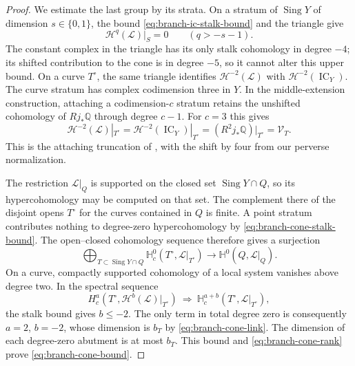 \documentclass[11pt]{amsart}
\theoremstyle{definition}
\theoremstyle{remark}
\numberwithin{equation}{section}
\newcommand{\Q}{\mathbb{Q}}
\DeclareMathOperator{\Sing}{Sing}
\DeclareMathOperator{\IC}{IC}
\begin{document}
\begin{proof}
We estimate the last group by its strata.  On a stratum of $\Sing Y$
of dimension $s\in\{0,1\}$, the bound
\eqref{eq:branch-ic-stalk-bound} and the triangle give
\begin{equation}\label{eq:branch-cone-stalk-bound}
 \mathcal H^q(\mathcal L)|_S=0\qquad(q>-s-1).
\end{equation}
The constant complex in the triangle has its only stalk cohomology
in degree $-4$; its shifted contribution to the cone is in degree
$-5$, so it cannot alter this upper bound.  On a curve $T^\circ$,
the same triangle identifies $\mathcal H^{-2}(\mathcal L)$ with
$\mathcal H^{-2}(\IC_Y)$.  The curve stratum has complex codimension
three in $Y$.  In the middle-extension construction, attaching a
codimension-$c$ stratum retains the unshifted cohomology of $Rj_*\Q$
through degree $c-1$.  For $c=3$ this gives
\begin{equation}\label{eq:branch-cone-link}
 \mathcal H^{-2}(\mathcal L)|_{T^\circ}
   =\mathcal H^{-2}(\IC_Y)|_{T^\circ}
   =(R^2j_*\Q)|_{T^\circ}=\mathcal V_T.
\end{equation}
This is the attaching truncation of
\cite[Section~3.1 and Section~3.3, Axiom {\rm[AX1]}(d)]{GoreskyMacPhersonIHII},
with the shift by four from our perverse normalization.

The restriction $\mathcal L|_Q$ is supported on the closed set
$\Sing Y\cap Q$, so its hypercohomology may be computed on that set.
The complement there of the disjoint opens $T^\circ$
for the curves contained in $Q$ is finite.  A point stratum contributes
nothing to degree-zero hypercohomology by
\eqref{eq:branch-cone-stalk-bound}.  The open--closed cohomology
sequence therefore gives a surjection
\[
 \bigoplus_{T\subset\Sing Y\cap Q}
       \mathbb H_c^0(T^\circ,\mathcal L|_{T^\circ})
       \longrightarrow\mathbb H^0(Q,\mathcal L|_Q).
\]
On a curve, compactly supported cohomology of a local system vanishes
above degree two.  In the spectral sequence
\[
 H_c^a(T^\circ,\mathcal H^b(\mathcal L)|_{T^\circ})
       \ \Longrightarrow\ 
 \mathbb H_c^{a+b}(T^\circ,\mathcal L|_{T^\circ}),
\]
the stalk bound gives $b\leq-2$.  The only term in total degree zero
is consequently $a=2$, $b=-2$, whose dimension is $b_T$ by
\eqref{eq:branch-cone-link}.  The dimension of each degree-zero
abutment is at most $b_T$.  This bound and
\eqref{eq:branch-cone-rank} prove \eqref{eq:branch-cone-bound}.
\end{proof}
\end{document}
